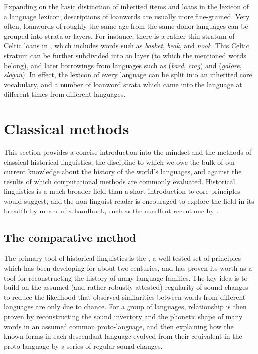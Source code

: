 Expanding on the basic distinction of inherited items and loans in the lexicon of a language lexicon, descriptions of loanwords are usually more fine-grained. Very often, loanwords of roughly the same age from the same donor languages can be grouped into strata or layers. For instance, there is a rather thin stratum of Celtic loans in , which includes words such as \textit{basket}, \textit{beak}, and \textit{nook}. This Celtic stratum can be further subdivided into an  layer (to which the mentioned words belong), and later borrowings from languages such as  (\textit{bard}, \textit{crag}) and  (\textit{galore}, \textit{slogan}). In effect, the lexicon of every language can be split into an inherited core vocabulary, and a number of loanword strata which came into the language at different times from different languages.

\section{Classical methods}\label{sec:2:4}
This section provides a concise introduction into the mindset and the methods of classical historical linguistics, the discipline to which we owe the bulk of our current knowledge about the history of the world's languages, and against the results of which computational methods are commonly evaluated. Historical linguistics is a much broader field than a short introduction to core principles would suggest, and the non-linguist reader is encouraged to explore the field in its breadth by means of a handbook, such as the excellent recent one by \citet{bowern_evans_2015}.

\subsection{The comparative method}
The primary tool of historical linguistics is the \textit{}, a well-tested set of principles which has been developing for about two centuries, and has proven its worth as a tool for reconstructing the history of many language families. The key idea is to build on the assumed (and rather robustly attested) regularity of sound changes to reduce the likelihood that observed similarities between words from different languages are only due to chance. For a group of languages, relationship is then proven by reconstructing the sound inventory and the phonetic shape of many words in an assumed common proto-language, and then explaining how the known forms in each descendant language evolved from their equivalent in the proto-language by a series of regular sound changes.

